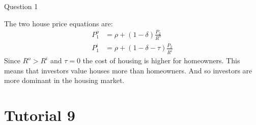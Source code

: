 \documentclass[a4paper]{article}
\begin{document}
\begin{questionbox}{Question 1}
\begin{enumerate}[(a)]
			\begin{explanationbox}
			The two house price equations are:
			\begin{align*}
				P_1^o &= \rho + (1 - \delta )\frac{P_2}{R^o} \\
				P_1^i &= \rho + (1 - \delta - \tau)\frac{P_2}{R^i}
			\end{align*}
			Since \( R^o > R^i \) and \( \tau = 0 \) the cost of housing is higher for homeowners. This means that investors value houses more than homeowners. And so investors are more dominant in the housing market.
			\end{explanationbox}
		\end{enumerate}
	\end{questionbox}
\section{Tutorial 9}
\end{document}
